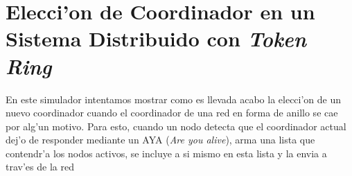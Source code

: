 \section{Elecci'on de Coordinador en un Sistema Distribuido con \emph{Token Ring}}
En este simulador intentamos mostrar como es llevada acabo la elecci'on de un
nuevo coordinador cuando el coordinador de una red en forma de anillo se cae
por alg'un motivo.
Para esto, cuando un nodo detecta que el coordinador actual dej'o de responder
mediante un AYA (\emph{Are you alive}), arma una lista que contendr'a los nodos
activos, se incluye a si mismo en esta lista y la envia a trav'es de la red

